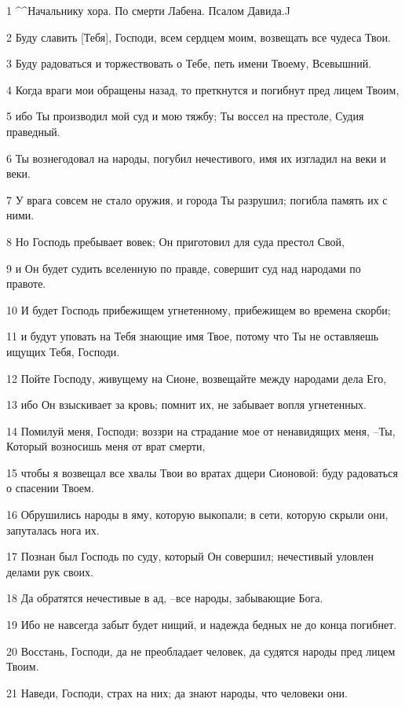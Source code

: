 \par 1 ^^Начальнику хора. По смерти Лабена. Псалом Давида.^^
\par 2 Буду славить [Тебя], Господи, всем сердцем моим, возвещать все чудеса Твои.
\par 3 Буду радоваться и торжествовать о Тебе, петь имени Твоему, Всевышний.
\par 4 Когда враги мои обращены назад, то преткнутся и погибнут пред лицем Твоим,
\par 5 ибо Ты производил мой суд и мою тяжбу; Ты воссел на престоле, Судия праведный.
\par 6 Ты вознегодовал на народы, погубил нечестивого, имя их изгладил на веки и веки.
\par 7 У врага совсем не стало оружия, и города Ты разрушил; погибла память их с ними.
\par 8 Но Господь пребывает вовек; Он приготовил для суда престол Свой,
\par 9 и Он будет судить вселенную по правде, совершит суд над народами по правоте.
\par 10 И будет Господь прибежищем угнетенному, прибежищем во времена скорби;
\par 11 и будут уповать на Тебя знающие имя Твое, потому что Ты не оставляешь ищущих Тебя, Господи.
\par 12 Пойте Господу, живущему на Сионе, возвещайте между народами дела Его,
\par 13 ибо Он взыскивает за кровь; помнит их, не забывает вопля угнетенных.
\par 14 Помилуй меня, Господи; воззри на страдание мое от ненавидящих меня, --Ты, Который возносишь меня от врат смерти,
\par 15 чтобы я возвещал все хвалы Твои во вратах дщери Сионовой: буду радоваться о спасении Твоем.
\par 16 Обрушились народы в яму, которую выкопали; в сети, которую скрыли они, запуталась нога их.
\par 17 Познан был Господь по суду, который Он совершил; нечестивый уловлен делами рук своих.
\par 18 Да обратятся нечестивые в ад, --все народы, забывающие Бога.
\par 19 Ибо не навсегда забыт будет нищий, и надежда бедных не до конца погибнет.
\par 20 Восстань, Господи, да не преобладает человек, да судятся народы пред лицем Твоим.
\par 21 Наведи, Господи, страх на них; да знают народы, что человеки они.

